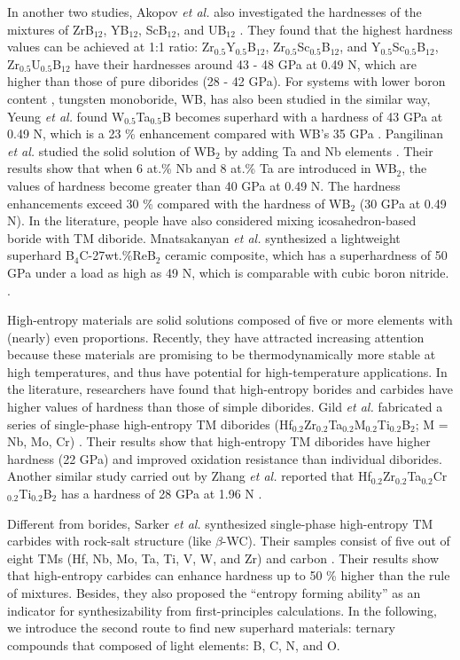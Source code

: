 In another two studies, Akopov {\it et al.} also investigated the hardnesses of the mixtures of ZrB$_{12}$, YB$_{12}$, ScB$_{12}$, and UB$_{12}$ \cite{YB12_akopov2019synthesis}. They found that the highest hardness values can be achieved at 1:1 ratio: Zr$_{0.5}$Y$_{0.5}$B$_{12}$, Zr$_{0.5}$Sc$_{0.5}$B$_{12}$, and Y$_{0.5}$Sc$_{0.5}$B$_{12}$, Zr$_{0.5}$U$_{0.5}$B$_{12}$ have their hardnesses around 43 - 48 GPa at 0.49 N, which are higher than those of pure diborides (28 - 42 GPa). For systems with lower boron content , tungsten monoboride, WB, has also been studied in the similar way, Yeung {\it et al.} found W$_{0.5}$Ta$_{0.5}$B becomes superhard with a hardness of 43 GPa at 0.49 N, which is a 23 \% enhancement compared with WB's 35 GPa \cite{WB_yeung2016superhard}. Pangilinan {\it et al.} studied the solid solution of WB$_2$ by adding Ta and Nb elements \cite{pangilinan2018superhard}. Their results show that when 6 at.\% Nb and 8 at.\% Ta are introduced in WB$_2$, the values of hardness become greater than 40 GPa at 0.49 N. The hardness enhancements exceed 30 \% compared with the hardness of WB$_2$ (30 GPa at 0.49 N). In the literature, people have also considered mixing icosahedron-based boride with TM diboride. Mnatsakanyan {\it et al.} synthesized a lightweight superhard B$_4$C-27wt.\%ReB$_2$ ceramic composite, which has a superhardness of 50 GPa under a load as high as 49 N, which is comparable with cubic boron nitride.  \cite{mnatsakanyan2021superhard}.

High-entropy materials are solid solutions composed of five or more elements with (nearly) even proportions. Recently, they have attracted increasing attention because these materials are promising to be thermodynamically more stable at high temperatures, and thus have potential for high-temperature applications. In the literature, researchers have found that high-entropy borides and carbides have higher values of hardness than those of simple diborides. Gild {\it et al.} fabricated a series of single-phase high-entropy TM diborides (Hf$_{0.2}$Zr$_{0.2}$Ta$_{0.2}$M$_{0.2}$Ti$_{0.2}$B$_2$; M = Nb, Mo, Cr) \cite{gild2016high}. Their results show that  high-entropy TM diborides have higher hardness (22 GPa) and improved oxidation resistance than individual diborides. Another similar study carried out by Zhang {\it et al.} reported that Hf$_{0.2}$Zr$_{0.2}$Ta$_{0.2}$Cr$_{0.2}$Ti$_{0.2}$B$_2$ has a hardness of 28 GPa at 1.96 N \cite{zhang2019dense}.

Different from borides, Sarker {\it et al.} synthesized single-phase high-entropy TM carbides with rock-salt structure (like $\beta$-WC). Their samples consist of five out of eight TMs (Hf, Nb, Mo, Ta, Ti, V, W, and Zr) and carbon \cite{sarker2018high}. Their results show that high-entropy carbides can enhance hardness up to 50 \% higher than the rule of mixtures. Besides, they also proposed the ``entropy forming ability'' as an indicator for synthesizability from first-principles calculations. In the following, we introduce the second route to find new superhard materials: ternary compounds that composed of light elements: B, C, N, and O.

